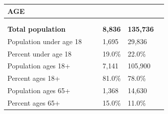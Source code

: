 \documentclass[9pt]{report}
\begin{document}
\vspace{24pt}
\setlength{\tabcolsep}{.01in} %
\begin{tabular}{p{.10in}p{.10in}p{.10in}p{3.7in}>{\hfill}p{.85in}>{\hfill}p{.85in}>{\hfill}p{.85in}>{\hfill}p{.85in}p{0.1in}}
\multicolumn{9}{l}{\parbox{7.1in}{\raggedright{\large{\strut\textbf{AGE}\strut}}}} \\ 
\hline
\multicolumn{4}{l}{\parbox{3.5in}{\raggedright{\textbf{}}}} & \multicolumn{1}{r}{\parbox{.85in}{\strut\raggedleft{\textbf{}\strut}}} & \multicolumn{1}{r}{\parbox{.85in}{\strut\raggedleft{\textbf{}\strut}}} & \multicolumn{1}{r}{\parbox{.85in}{\strut{}}} & \multicolumn{1}{r}{\parbox{.85in}{\strut{}}} & \\ 
\multicolumn{9}{l}{} \\ 
\multicolumn{4}{l}{\parbox{3.5in}{\strut\raggedright{\textbf{Total population}\strut}}} & \textbf{} & \textbf{} & \textbf{8,836} & \textbf{135,736} & \textbf{} \\ 
\multicolumn{4}{l}{\parbox{3.6in}{\strut\raggedright{{Population under age 18}}\strut}} &  &  & 1,695 & 29,836 & \multicolumn{1}{l}{}  \\ 
\multicolumn{4}{l}{\parbox{3.6in}{\strut\raggedright{{Percent under age 18}}\strut}} &  &  & 19.0\% & 22.0\% & \multicolumn{1}{l}{}  \\ 
\multicolumn{4}{l}{\parbox{3.6in}{\strut\raggedright{{Population ages 18+}}\strut}} &  &  & 7,141 & 105,900 & \multicolumn{1}{l}{}  \\ 
\multicolumn{4}{l}{\parbox{3.6in}{\strut\raggedright{{Percent ages 18+}}\strut}} &  &  & 81.0\% & 78.0\% & \multicolumn{1}{l}{}  \\ 
\multicolumn{4}{l}{\parbox{3.6in}{\strut\raggedright{{Population ages 65+}}\strut}} &  &  & 1,368 & 14,630 & \multicolumn{1}{l}{}  \\ 
\multicolumn{4}{l}{\parbox{3.6in}{\strut\raggedright{{Percent ages 65+}}\strut}} &  &  & 15.0\% & 11.0\% & \multicolumn{1}{l}{}  \\ 

\end{tabular}
\setlength{\tabcolsep}{6pt} %
\end{document}

